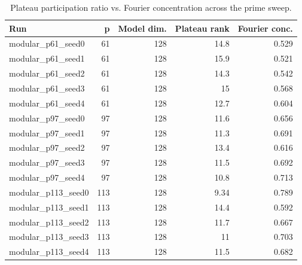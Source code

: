 \begin{table}
\caption{Plateau participation ratio vs. Fourier concentration across the prime sweep.}
\label{tab:h1}
\begin{tabular}{lrrrr}
\toprule
Run & p & Model dim. & Plateau rank & Fourier conc. \\
\midrule
modular\_p61\_seed0 & 61 & 128 & 14.8 & 0.529 \\
modular\_p61\_seed1 & 61 & 128 & 15.9 & 0.521 \\
modular\_p61\_seed2 & 61 & 128 & 14.3 & 0.542 \\
modular\_p61\_seed3 & 61 & 128 & 15 & 0.568 \\
modular\_p61\_seed4 & 61 & 128 & 12.7 & 0.604 \\
modular\_p97\_seed0 & 97 & 128 & 11.6 & 0.656 \\
modular\_p97\_seed1 & 97 & 128 & 11.3 & 0.691 \\
modular\_p97\_seed2 & 97 & 128 & 13.4 & 0.616 \\
modular\_p97\_seed3 & 97 & 128 & 11.5 & 0.692 \\
modular\_p97\_seed4 & 97 & 128 & 10.8 & 0.713 \\
modular\_p113\_seed0 & 113 & 128 & 9.34 & 0.789 \\
modular\_p113\_seed1 & 113 & 128 & 14.4 & 0.592 \\
modular\_p113\_seed2 & 113 & 128 & 11.7 & 0.667 \\
modular\_p113\_seed3 & 113 & 128 & 11 & 0.703 \\
modular\_p113\_seed4 & 113 & 128 & 11.5 & 0.682 \\
\bottomrule
\end{tabular}
\end{table}
